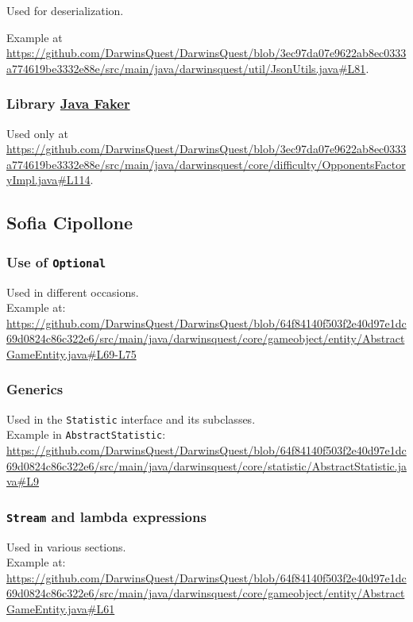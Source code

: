 \documentclass[12pt, a4paper]{report}
\theoremstyle{definition}
\begin{document}
        Used for deserialization.

        Example at \url{https://github.com/DarwinsQuest/DarwinsQuest/blob/3ec97da07e9622ab8ec0333a774619be3332e88e/src/main/java/darwinsquest/util/JsonUtils.java#L81}.
        
        \subsubsection{Library \href{https://github.com/DiUS/java-faker}{Java Faker}}
        
        Used only at \url{https://github.com/DarwinsQuest/DarwinsQuest/blob/3ec97da07e9622ab8ec0333a774619be3332e88e/src/main/java/darwinsquest/core/difficulty/OpponentsFactoryImpl.java#L114}.

    \subsection*{Sofia Cipollone}

    \subsubsection{Use of \texttt{Optional}}
    Used in different occasions.\\
    Example at: \url{https://github.com/DarwinsQuest/DarwinsQuest/blob/64f84140f503f2e40d97e1dc69d0824c86c322e6/src/main/java/darwinsquest/core/gameobject/entity/AbstractGameEntity.java#L69-L75}

    \subsubsection{Generics}
    Used in the \verb|Statistic| interface and its subclasses.\\
    Example in \verb|AbstractStatistic|: \url{https://github.com/DarwinsQuest/DarwinsQuest/blob/64f84140f503f2e40d97e1dc69d0824c86c322e6/src/main/java/darwinsquest/core/statistic/AbstractStatistic.java#L9}

    \subsubsection{\texttt{Stream} and lambda expressions}
    Used in various sections.\\
    Example at: \url{https://github.com/DarwinsQuest/DarwinsQuest/blob/64f84140f503f2e40d97e1dc69d0824c86c322e6/src/main/java/darwinsquest/core/gameobject/entity/AbstractGameEntity.java#L61}
\end{document}

